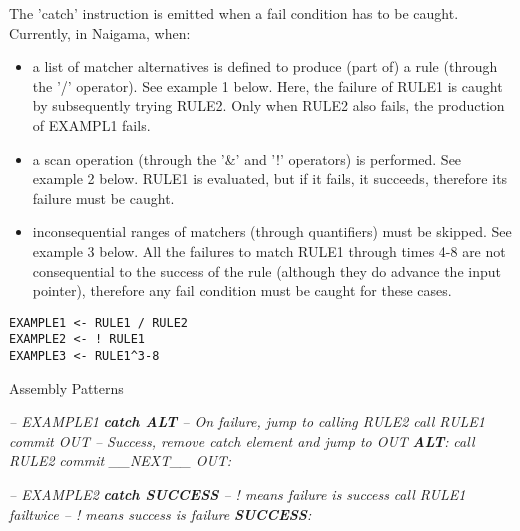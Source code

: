 The 'catch' instruction is emitted when a fail condition has to be
caught. Currently, in Naigama, when:

\begin{itemize}
\item a list of matcher alternatives is defined to produce (part of) a rule
      (through the '/' operator). See example 1 below.
      Here, the failure of RULE1 is caught by subsequently trying RULE2.
      Only when RULE2 also fails, the production of EXAMPL1 fails.
\item a scan operation (through the '\&' and '!' operators) is performed.
      See example 2 below. RULE1 is evaluated, but if it fails, it succeeds,
      therefore its failure must be caught.
\item inconsequential ranges of matchers (through quantifiers) must be skipped.
      See example 3 below. All the failures to match RULE1 through times
      4-8 are not consequential to the success of the rule (although they
      do advance the input pointer), therefore any fail condition must be
      caught for these cases.
\end{itemize}

\begin{myquote}
\begin{verbatim}
EXAMPLE1 <- RULE1 / RULE2
EXAMPLE2 <- ! RULE1
EXAMPLE3 <- RULE1^3-8
\end{verbatim}
\end{myquote}

Assembly Patterns

\begin{myquote}
\textit{-- EXAMPLE1} \newline
\textit{\textbf{catch ALT} -- On failure, jump to calling RULE2} \newline
\textit{call RULE1} \newline
\textit{commit OUT -- Success, remove catch element and jump to OUT} \newline
\textit{\textbf{ALT}:} \newline
\textit{call RULE2} \newline
\textit{commit \_\_NEXT\_\_} \newline
\textit{OUT:} \newline
\end{myquote}

\begin{myquote}
\textit{-- EXAMPLE2} \newline
\textit{\textbf{catch SUCCESS} -- ! means failure is success} \newline
\textit{call RULE1} \newline
\textit{failtwice -- ! means success is failure} \newline
\textit{\textbf{SUCCESS}:} \newline
\end{myquote}

